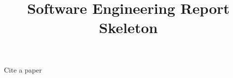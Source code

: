 \documentclass{article}
\title{Software Engineering Report Skeleton}
\begin{document}
\maketitle


\newpage









\newpage
Cite a paper\cite{siggraph00}


\end{document}
